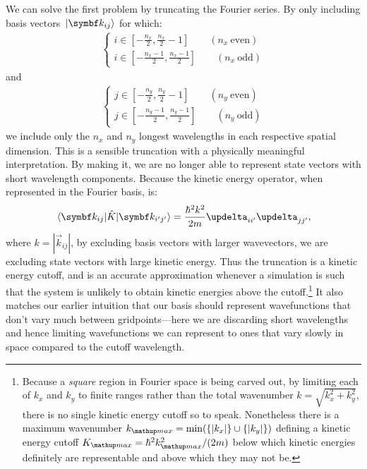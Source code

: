 We can solve the first problem by truncating the Fourier series. By only including basis vectors $\ket{\vec k_{ij}}$ for which:
\begin{align}
\begin{cases}
i \in [-\tfrac{n_x}2, \tfrac{n_x}2 - 1] \qquad (n_x\ \textrm{even})\\
i \in [-\tfrac{n_x - 1}2, \tfrac{n_x - 1}2] \qquad (n_x\ \textrm{odd})
\end{cases}
\end{align}
and
\begin{align}
\begin{cases}
j \in [-\tfrac{n_y}2, \tfrac{n_y}2 - 1] \qquad (n_y\ \textrm{even})\\
j \in [-\tfrac{n_y - 1}2, \tfrac{n_y - 1}2] \qquad (n_y\ \textrm{odd})
\end{cases}
\end{align}
we include only the $n_x$ and $n_y$ longest wavelengths in each respective spatial dimension. This is a sensible truncation with a physically meaningful interpretation. By making it, we are no longer able to represent state vectors with short wavelength components. Because the kinetic energy operator, when represented in the Fourier basis, is:
\begin{align}
\matrixel{\vec k_{ij}}{\hat K}{\vec k_{i^\prime j^\prime}} = \frac{\hbar^2 k^2}{2m}\updelta_{ii^\prime}\updelta_{jj^\prime},
\end{align}
where $k = |\vec k_{ij}|$, by excluding basis vectors with larger wavevectors, we are excluding state vectors with large kinetic energy. Thus the truncation is a kinetic energy cutoff, and is an accurate approximation whenever a simulation is such that the system is unlikely to obtain kinetic energies above the cutoff.\footnote{Because a \emph{square} region in Fourier space is being carved out, by limiting each of $k_x$ and $k_y$ to finite ranges rather than the total wavenumber $k = \sqrt{k_x^2 + k_y^2}$, there is no single kinetic energy cutoff so to speak. Nonetheless there is a maximum wavenumber $k_\up{max} = \min(\{|k_x|\} \cup \{|k_y|\})$ defining a kinetic energy cutoff $K_\up{max} = \hbar^2k_\up{max}^2/(2m)$ below which kinetic energies definitely are representable and above which they may not be.} It also matches our earlier intuition that our basis should represent wavefunctions that don't vary much between gridpoints---here we are discarding short wavelengths and hence limiting wavefunctions we can represent to ones that vary slowly in space compared to the cutoff wavelength.

